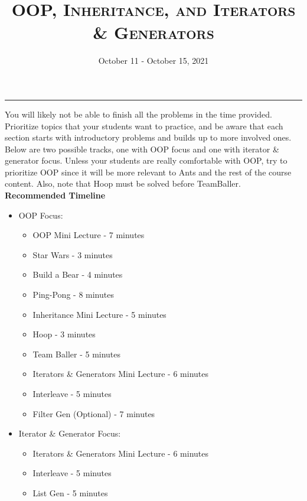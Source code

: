 \documentclass{exam}
\title{\textsc{OOP, Inheritance, and Iterators \& Generators}}
\date{October 11 - October 15, 2021}
\begin{document}
\maketitle
\rule{\textwidth}{0.15em}
\fontsize{12}{15}\selectfont


\begin{guide}
    You will likely not be able to finish all the problems in the time provided. Prioritize topics that your students want to practice, 
    and be aware that each section starts with introductory problems and builds up to more involved ones. Below are two possible 
    tracks, one with OOP focus and one with iterator \& generator focus. Unless your students are really comfortable with OOP, 
    try to prioritize OOP since it will be more relevant to Ants and the rest of the course content. Also, note that Hoop must be 
    solved before TeamBaller.
    \newline
    \textbf{Recommended Timeline}
    \begin{itemize}
        \item OOP Focus:
        \begin{itemize}
            \item OOP Mini Lecture - 7 minutes
            \item Star Wars - 3 minutes
            \item Build a Bear - 4 minutes
            \item Ping-Pong - 8 minutes
            \item Inheritance Mini Lecture - 5 minutes
            \item Hoop - 3 minutes
            \item Team Baller - 5 minutes
            \item Iterators \& Generators Mini Lecture - 6 minutes
            \item Interleave - 5 minutes
            \item Filter Gen (Optional) - 7 minutes
        \end{itemize}
        \item Iterator \& Generator Focus:
        \begin{itemize}
            \item Iterators \& Generators Mini Lecture - 6 minutes
            \item Interleave - 5 minutes
            \item List Gen - 5 minutes

\end{itemize}
\end{itemize}
\end{guide}
\end{document}
